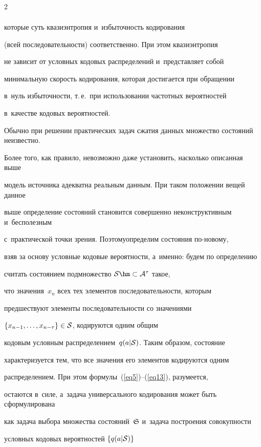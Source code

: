 \begin{multicols}{2}
\begin{multline}
\end{multline}

которые суть квазиэнтропия и~избыточность кодирования 

(всей последовательности) соответственно. При этом квазиэнтропия 

не зависит от условных кодовых распределений и~представляет собой 

минимальную скорость кодирования, которая достигается при обращении 

в~нуль избыточности, т.\,е.\ при использовании частотных вероятностей 

в~качестве кодовых вероятностей.



Обычно при решении практических задач сжатия данных множество состояний неизвестно. 

Более того, как правило, невозможно даже установить, насколько описанная выше 

модель источника адекватна реальным данным. При таком положении вещей данное 

выше определение состояний становится совершенно неконструктивным и~бесполезным 

с~практической точки зрения. Поэтому\linebreak определим состояния по-но\-во\-му, 

взяв за основу условные кодовые вероятности, а~именно: будем по определению 

считать состоянием под\-мно\-жество ${\cal S}\hm\subset{\cal A}^\tau$ такое, 

что значения~$x_n$ всех тех элементов последовательности, которым 

пред\-шест\-ву\-ют элементы последовательности со значениями 

$\{x_{n-1},\ldots,x_{n-\tau}\}\in{\cal S}$, кодируются одним общим 

кодовым условным распределением~$q(a|{\cal S})$. Таким образом, состояние 

характеризуется тем, что все значения его элементов кодируются одним 

распределением. При этом формулы~(\ref{eq5})--(\ref{eq13}), разумеется, 

остаются в~силе, а~задача универсального кодирования может быть сформулирована 

как задача выбора множества состояний~${\frak S}$ и~задача построения совокупности 

условных кодовых вероятностей $\{q(a|{\cal S})\}$ 


\end{multicols}
